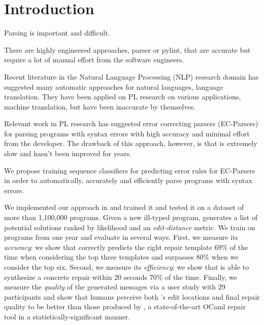 \section{Introduction}
\label{sec:intro}

Parsing is important and difficult.

There are highly engineered approaches, \eg parser or pylint, that are accurate
but require a lot of manual effort from the software engineers.

Recent literature in the Natural Language Processing (NLP) research domain has
suggested many automatic approaches for natural languages, \eg language
translation. They have been applied on PL research on various applications, \eg
machine translation, but have been inaccurate by themselves.

Relevant work in PL research has suggested error correcting parsers (EC-Parsers)
for parsing programs with syntax errors with high accuracy and minimal effort
from the developer. The drawback of this approach, however, is that is extremely
slow and hasn't been improved for years.

\mypara{\toolname}
We propose training sequence classifiers for predicting error rules for
EC-Parsers in order to automatically, accurately and efficiently parse programs
with syntax errors.

We implemented our approach in \toolname and trained it and tested it on a
dataset of more than 1,100,000 programs. Given a new ill-typed program,
\toolname generates a list of potential solutions ranked by likelihood and an
\emph{edit-distance} metric. We train \toolname on programs from one year and
evaluate in several ways.
%
First, we measure its \emph{accuracy}: we show that \toolname correctly predicts
the right repair template 69\% of the time when considering the top three
templates and surpasses 80\% when we consider the top six.
%
Second, we measure its \emph{efficiency}: we show that \toolname is able to
synthesize a concrete repair within 20 seconds 70\% of the time.
%
Finally, we measure the \emph{quality} of the generated messages via a user
study with 29 participants and show that humans perceive both \toolname's edit
locations and final repair quality to be better than those produced by \seminal,
a state-of-the-art OCaml repair tool \citep{Lerner2007-dt} in a
statistically-significant manner.

